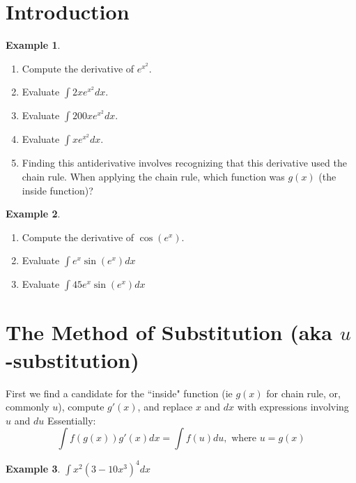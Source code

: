 \documentclass{article}[12pt]
\theoremstyle{definition}
\theoremstyle{example}
\newtheorem{example}{Example}[section]
\theoremstyle{theorem}
\begin{document}
\section{Introduction}
\begin{example}
\begin{enumerate}
\item Compute the derivative of $e^{x^2}$. 
\vspace{2.5cm}
\item Evaluate $\int 2xe^{x^2}dx$. 
\vspace{2.5cm}
\item Evaluate $\int 200xe^{x^2}dx$. 
\vspace{2.5cm}
\item Evaluate $\int xe^{x^2}dx$. 
\vspace{2.5cm}
\item Finding this antiderivative involves recognizing that this derivative used the chain rule. When applying the chain rule, which function was $g(x)$ (the inside function)?
\vspace{2.5cm}
\end{enumerate}
\end{example}
\begin{example}
\begin{enumerate}
\item Compute the derivative of $\cos(e^x)$. 
\vspace{2.5cm}
\item Evaluate $\int e^x\sin(e^x)dx$ 
\vspace{2.5cm}
\item Evaluate $\int 45e^x\sin(e^x)dx$
\vspace{2.5cm}
\end{enumerate}
\end{example}
\section{The Method of Substitution (aka $u$-substitution)}
First we find a candidate for the ``inside" function (ie $g(x)$ for chain rule, or, commonly $u$), compute $g'(x)$, and replace $x$ and $dx$ with expressions involving $u$ and $du$ 
Essentially:
\[\int f(g(x))g'(x)dx=\int f(u)du,\text{ where }u=g(x)\]
\begin{example}
$\int x^2(3-10x^3)^4dx$
\end{example} 
\vspace{2.5cm}
\end{document}
